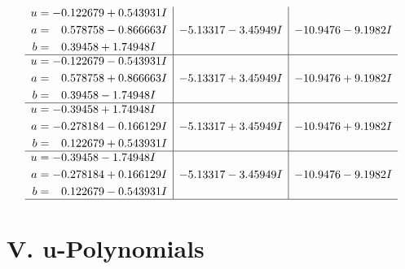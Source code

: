\documentclass[1p]{elsarticle_modified}
\theoremstyle{definition}
\begin{document}
$$\begin{array}{c|c|c}
\begin{aligned}
u &= -0.122679 + 0.543931 I \\
a &= \phantom{-}0.578758 - 0.866663 I \\
b &= \phantom{-}0.39458 + 1.74948 I\end{aligned}
 & -5.13317 - 3.45949 I & -10.9476 - 9.1982 I \\ \hline\begin{aligned}
u &= -0.122679 - 0.543931 I \\
a &= \phantom{-}0.578758 + 0.866663 I \\
b &= \phantom{-}0.39458 - 1.74948 I\end{aligned}
 & -5.13317 + 3.45949 I & -10.9476 + 9.1982 I \\ \hline\begin{aligned}
u &= -0.39458 + 1.74948 I \\
a &= -0.278184 - 0.166129 I \\
b &= \phantom{-}0.122679 + 0.543931 I\end{aligned}
 & -5.13317 + 3.45949 I & -10.9476 + 9.1982 I \\ \hline\begin{aligned}
u &= -0.39458 - 1.74948 I \\
a &= -0.278184 + 0.166129 I \\
b &= \phantom{-}0.122679 - 0.543931 I\end{aligned}
 & -5.13317 - 3.45949 I & -10.9476 - 9.1982 I\\
 \hline 
 \end{array}$$\newpage
\newpage\renewcommand{\arraystretch}{1}
\centering \section*{ V. u-Polynomials}
\end{document}
